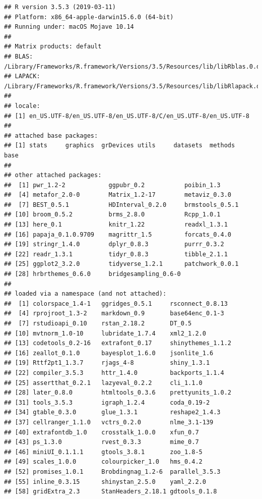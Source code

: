 \documentclass[floatsintext,doc]{apa6}
\begin{document}
\begin{verbatim}
## R version 3.5.3 (2019-03-11)
## Platform: x86_64-apple-darwin15.6.0 (64-bit)
## Running under: macOS Mojave 10.14
## 
## Matrix products: default
## BLAS: /Library/Frameworks/R.framework/Versions/3.5/Resources/lib/libRblas.0.dylib
## LAPACK: /Library/Frameworks/R.framework/Versions/3.5/Resources/lib/libRlapack.dylib
## 
## locale:
## [1] en_US.UTF-8/en_US.UTF-8/en_US.UTF-8/C/en_US.UTF-8/en_US.UTF-8
## 
## attached base packages:
## [1] stats     graphics  grDevices utils     datasets  methods   base     
## 
## other attached packages:
##  [1] pwr_1.2-2            ggpubr_0.2           poibin_1.3          
##  [4] metafor_2.0-0        Matrix_1.2-17        metaviz_0.3.0       
##  [7] BEST_0.5.1           HDInterval_0.2.0     brmstools_0.5.1     
## [10] broom_0.5.2          brms_2.8.0           Rcpp_1.0.1          
## [13] here_0.1             knitr_1.22           readxl_1.3.1        
## [16] papaja_0.1.0.9709    magrittr_1.5         forcats_0.4.0       
## [19] stringr_1.4.0        dplyr_0.8.3          purrr_0.3.2         
## [22] readr_1.3.1          tidyr_0.8.3          tibble_2.1.1        
## [25] ggplot2_3.2.0        tidyverse_1.2.1      patchwork_0.0.1     
## [28] hrbrthemes_0.6.0     bridgesampling_0.6-0
## 
## loaded via a namespace (and not attached):
##  [1] colorspace_1.4-1   ggridges_0.5.1     rsconnect_0.8.13  
##  [4] rprojroot_1.3-2    markdown_0.9       base64enc_0.1-3   
##  [7] rstudioapi_0.10    rstan_2.18.2       DT_0.5            
## [10] mvtnorm_1.0-10     lubridate_1.7.4    xml2_1.2.0        
## [13] codetools_0.2-16   extrafont_0.17     shinythemes_1.1.2 
## [16] zeallot_0.1.0      bayesplot_1.6.0    jsonlite_1.6      
## [19] Rttf2pt1_1.3.7     rjags_4-8          shiny_1.3.1       
## [22] compiler_3.5.3     httr_1.4.0         backports_1.1.4   
## [25] assertthat_0.2.1   lazyeval_0.2.2     cli_1.1.0         
## [28] later_0.8.0        htmltools_0.3.6    prettyunits_1.0.2 
## [31] tools_3.5.3        igraph_1.2.4       coda_0.19-2       
## [34] gtable_0.3.0       glue_1.3.1         reshape2_1.4.3    
## [37] cellranger_1.1.0   vctrs_0.2.0        nlme_3.1-139      
## [40] extrafontdb_1.0    crosstalk_1.0.0    xfun_0.7          
## [43] ps_1.3.0           rvest_0.3.3        mime_0.7          
## [46] miniUI_0.1.1.1     gtools_3.8.1       zoo_1.8-5         
## [49] scales_1.0.0       colourpicker_1.0   hms_0.4.2         
## [52] promises_1.0.1     Brobdingnag_1.2-6  parallel_3.5.3    
## [55] inline_0.3.15      shinystan_2.5.0    yaml_2.2.0        
## [58] gridExtra_2.3      StanHeaders_2.18.1 gdtools_0.1.8     

\end{verbatim}
\end{document}
